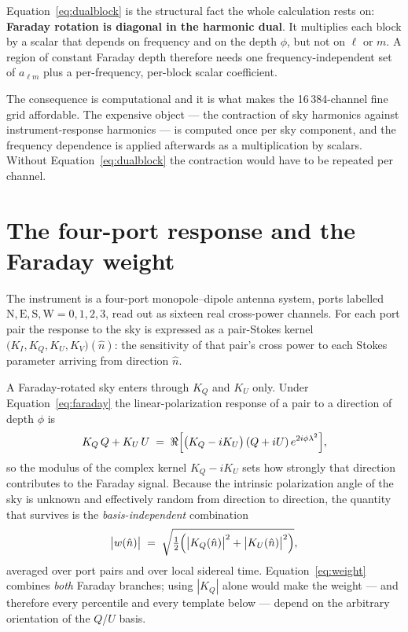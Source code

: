\documentclass[11pt]{article}
\newcommand{\lamsq}{\ensuremath{\lambda^{2}}}
\begin{document}
Equation~\eqref{eq:dualblock} is the structural fact the whole
calculation rests on: \textbf{Faraday rotation is diagonal in the
harmonic dual}. It multiplies each block by a scalar that depends on
frequency and on the depth $\phi$, but not on $\ell$ or $m$. A region of
constant Faraday depth therefore needs one frequency-independent set of
$a_{\ell m}$ plus a per-frequency, per-block scalar coefficient.

The consequence is computational and it is what makes the 16\,384-channel
fine grid affordable. The expensive object --- the contraction of sky
harmonics against instrument-response harmonics --- is computed once per
sky component, and the frequency dependence is applied afterwards as a
multiplication by scalars. Without Equation~\eqref{eq:dualblock} the
contraction would have to be repeated per channel.

\section{The four-port response and the Faraday weight}
\label{sec:weight}

The instrument is a four-port monopole--dipole antenna system, ports
labelled $\mathrm{N,E,S,W} = 0,1,2,3$, read out as sixteen real
cross-power channels. For each port pair the response to the sky is
expressed as a pair-Stokes kernel $\bigl(K_I, K_Q, K_U, K_V\bigr)(\hat n)$:
the sensitivity of that pair's cross power to each Stokes parameter
arriving from direction $\hat n$.

A Faraday-rotated sky enters through $K_Q$ and $K_U$ only. Under
Equation~\eqref{eq:faraday} the linear-polarization response of a pair to
a direction of depth $\phi$ is
\begin{equation}
  K_Q\,Q + K_U\,U \;=\;
  \Re\Bigl[\bigl(K_Q - iK_U\bigr)\,(Q+iU)\,e^{2i\phi\lamsq}\Bigr],
\end{equation}
so the modulus of the complex kernel $K_Q - iK_U$ sets how strongly that
direction contributes to the Faraday signal. Because the intrinsic
polarization angle of the sky is unknown and effectively random from
direction to direction, the quantity that survives is the
\emph{basis-independent} combination
\begin{equation}
  \bigl|w(\hat n)\bigr| \;=\;
  \sqrt{\tfrac12\Bigl(\bigl|K_Q(\hat n)\bigr|^2 + \bigl|K_U(\hat
  n)\bigr|^2\Bigr)},
  \label{eq:weight}
\end{equation}
averaged over port pairs and over local sidereal time.
Equation~\eqref{eq:weight} combines \emph{both} Faraday branches; using
$|K_Q|$ alone would make the weight --- and therefore every percentile
and every template below --- depend on the arbitrary orientation of the
$Q$/$U$ basis.
\end{document}
